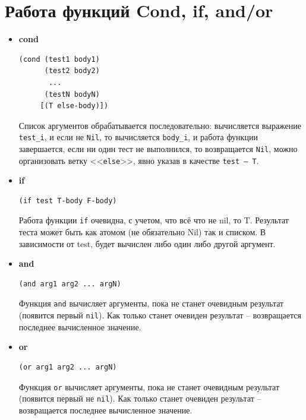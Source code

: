 \documentclass[a4paper,14pt, unknownkeysallowed]{extreport}
\begin{document}
\section{Работа функций Cond, if, and/or}

\begin{itemize}
	\item \textbf{cond}
	

	\begin{center}
	\captionsetup{justification=raggedright,singlelinecheck=off}
	\begin{lstlisting}
(cond (test1 body1) 
	  (test2 body2)
	   ...
	  (testN bodyN)
	 [(T else-body)])
	\end{lstlisting}
	\end{center}

	Список аргументов обрабатывается последовательно: вычисляется выражение \texttt{test\_i}, и если не \texttt{Nil}, то вычисляется \texttt{body\_i}, и работа функции завершается, если ни один тест не выполнился, то возвращается \texttt{Nil}, можно организовать ветку <<\texttt{else}>>, явно указав в качестве \texttt{test -- Т}.

	\item \textbf{if}
	
	\begin{center}
	\captionsetup{justification=raggedright,singlelinecheck=off}
	\begin{lstlisting}
(if test T-body F-body)
	\end{lstlisting}
	\end{center}

	Работа функции \texttt{if} очевидна, с учетом, что всё что не nil, то T. Результат теста может быть как атомом (не обязательно Nil) так и списком. В зависимости от test, будет вычислен либо один либо другой аргумент.

	\item \textbf{and}
	
	\begin{center}
	\captionsetup{justification=raggedright,singlelinecheck=off}
	\begin{lstlisting}
(and arg1 arg2 ... argN) 
	\end{lstlisting}
	\end{center}

	Функция \texttt{and} вычисляет аргументы, пока не станет очевидным результат (появится первый \texttt{nil}). Как только станет очевиден результат -- возвращается последнее вычисленное значение.

	\item \textbf{or}
	
	\begin{center}
	\captionsetup{justification=raggedright,singlelinecheck=off}
	\begin{lstlisting}
(or arg1 arg2 ... argN)
	\end{lstlisting}
	\end{center}

	Функция \texttt{or} вычисляет аргументы, пока не станет очевидным результат (появится первый не \texttt{nil}). Как только станет очевиден результат -- возвращается последнее вычисленное значение.

\end{itemize}
\end{document}
